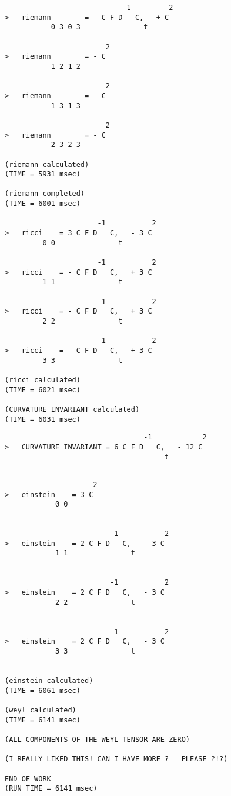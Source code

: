 \begin{verbatim}
                            -1         2
>   riemann        = - C F D   C,   + C
           0 3 0 3               t

                        2
>   riemann        = - C
           1 2 1 2

                        2
>   riemann        = - C
           1 3 1 3

                        2
>   riemann        = - C
           2 3 2 3

(riemann calculated)
(TIME = 5931 msec)

(riemann completed)
(TIME = 6001 msec)

                      -1           2
>   ricci    = 3 C F D   C,   - 3 C
         0 0               t

                      -1           2
>   ricci    = - C F D   C,   + 3 C
         1 1               t

                      -1           2
>   ricci    = - C F D   C,   + 3 C
         2 2               t

                      -1           2
>   ricci    = - C F D   C,   + 3 C
         3 3               t

(ricci calculated)
(TIME = 6021 msec)

(CURVATURE INVARIANT calculated)
(TIME = 6031 msec)

\end{verbatim}
{\samepage
\begin{verbatim}
                                 -1            2
>   CURVATURE INVARIANT = 6 C F D   C,   - 12 C
                                      t
\end{verbatim}
   }
\begin{verbatim}

                     2
>   einstein    = 3 C
            0 0


                         -1           2
>   einstein    = 2 C F D   C,   - 3 C
            1 1               t


                         -1           2
>   einstein    = 2 C F D   C,   - 3 C
            2 2               t


                         -1           2
>   einstein    = 2 C F D   C,   - 3 C
            3 3               t


(einstein calculated)
(TIME = 6061 msec)

(weyl calculated)
(TIME = 6141 msec)

(ALL COMPONENTS OF THE WEYL TENSOR ARE ZERO)

(I REALLY LIKED THIS! CAN I HAVE MORE ?   PLEASE ?!?)

END OF WORK
(RUN TIME = 6141 msec)
\end{verbatim}

